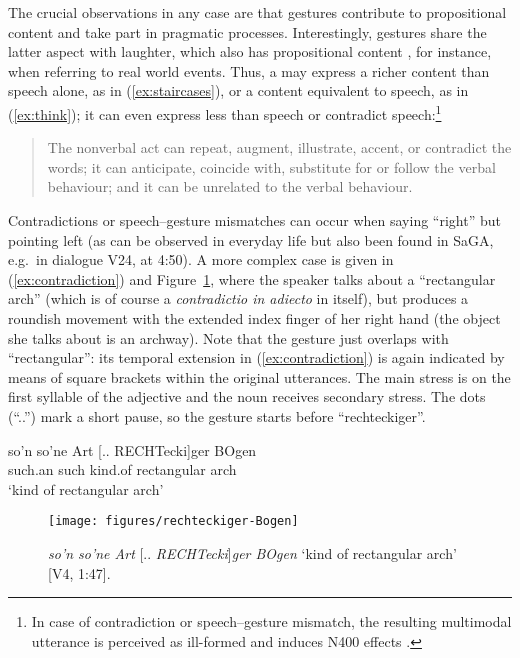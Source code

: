 \documentclass[output=paper
 	        ,biblatex
                ,babelshorthands
                ,newtxmath
                ,draftmode
                ,colorlinks, citecolor=brown
]{langscibook}
\begin{document}
The crucial observations in any case are that gestures contribute to propositional content and take part in pragmatic processes.
%
Interestingly, gestures share the latter aspect with laughter, which also has propositional content \citep{Ginzburg:Breitholz:Cooper:Hough:Tian:2015}, for instance, when referring to real world events.
%
Thus, a  may express a richer content than speech alone, as in (\ref{ex:staircases}), or a content equivalent to speech, as in (\ref{ex:think}); it can even express less than speech or contradict speech:\footnote{In case of contradiction or speech--gesture mismatch, the resulting multimodal utterance is perceived as ill-formed and induces N400 effects \citep{Wu:Coulson:2005,Kelly:Kravitz:Hopkins:2004}.}
%
\begin{quote}
The nonverbal act can repeat, augment, illustrate, accent, or contradict the words; it can anticipate, coincide with, substitute for or follow the verbal behaviour; and it can be unrelated to the verbal behaviour.\hfill 
\citep[53]{Ekman:Friesen:1969}
\end{quote}

\noindent Contradictions or speech--gesture mismatches can occur when saying \enquote{right} but pointing left (as can be observed in everyday life but also been found in SaGA, e.g.\ in dialogue V24, at 4:50).
%
A more complex case is given in (\ref{ex:contradiction}) and Figure~\ref{fig:contradiction}, where the speaker talks about a \enquote{rectangular arch} (which is of course a \textit{contradictio in adiecto} in itself), but produces a roundish movement with the extended index finger of her right hand (the object she talks about is an archway).
%
Note that the gesture just overlaps with \enquote{rectangular}: its temporal extension in (\ref{ex:contradiction}) is again indicated by means of square brackets within the original  utterances. 
%
The main stress is on the first syllable of the adjective and the noun receives secondary stress.
%
The dots (\enquote{..}) mark a short pause, so the gesture starts before \enquote{rechteckiger}.

\ea \label{ex:contradiction}
\gll 
 so'n so'ne Art {[.. RECHTecki]ger} BOgen \\
such.an such kind.of rectangular arch \\
\glt 
\enquote*{kind of rectangular arch}
\z

\begin{figure}
  \centering
  \texttt{[image: figures/rechteckiger-Bogen]}
  \caption[Rectangular arch]{\textit{so'n so'ne Art} [.. \textit{RECHTecki}]\textit{ger BOgen} \enquote*{kind of rectangular arch} [V4, 1:47].}
  \label{fig:contradiction}
\end{figure}
\end{document}
